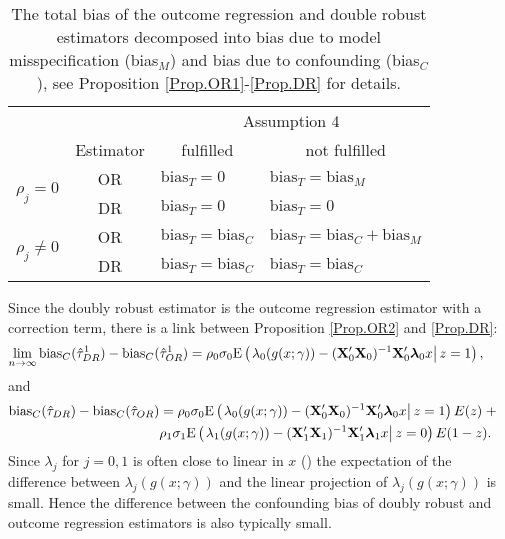 \documentclass[11pt]{article}
\newcommand{\E}{{\mbox{E}}}
\newcommand{\X}{{\bf X}}
\newcommand{\limes}{\lim \limits_{n\to\infty}}
\newcommand{\bias}{\mbox{bias}}
\begin{document}
\begin{table}[ht]
\caption{The total bias of the outcome regression and double robust estimators decomposed into bias due to model misspecification (bias$_M$) and bias due to confounding (bias$_C$), see Proposition \ref{Prop.OR1}-\ref{Prop.DR} for details.}
\begin{center}
\begin{tabular}{cc| l| l}
\hline
	&\multicolumn{1}{c}{}&\multicolumn{2}{c}{Assumption 4} \\
	&\multicolumn{1}{c}{Estimator}&\multicolumn{1}{c}{fulfilled}&\multicolumn{1}{c}{not fulfilled}\\
	\hline\hline
\multirow{2}{*}{$\rho_j=0$}&OR& $\bias_T=0$&$\bias_T=\bias_M$\\
	&DR&$\bias_T=0$& $\bias_T=0$\\
	\hline
	\multirow{2}{*}{$\rho_j\neq0$}&OR &$\bias_T=\bias_C$&$\bias_T=\bias_C +\bias_M$ \\
	&DR&$\bias_T=\bias_C$ &$\bias_T=\bias_C$ \\
\hline
\end{tabular}
\end{center}
\label{tab:bias.overview}
\end{table}
Since the doubly robust estimator is the outcome regression estimator with a correction term, there is a link between Proposition \ref{Prop.OR2} and \ref{Prop.DR}:
 \begin{align*}\limes \mbox{bias}_C(\hat \tau^1_{DR}) - \mbox{bias}_C(\hat \tau^1_{OR}) =  \rho_0 \sigma_0  \E\left(\left.\lambda_0(g(x; \gamma)) -   (\X_0' \X_0)^{-1} \X_0' {\boldsymbol \lambda_0 } x \right| z=1 \right),\qquad
 \end{align*}
 and
 \begin{align*} \mbox{bias}_C(\hat \tau_{DR}) - \mbox{bias}_C(\hat \tau_{OR}) &=   \rho_0 \sigma_0  \E\left(\left.\lambda_0(g(x; \gamma)) -   (\X_0' \X_0)^{-1} \X_0' {\boldsymbol \lambda_0 } x \right| z=1 \right)E(z)  \;+\quad \\
& \rho_1 \sigma_1  \E\left(\left.\lambda_1(g(x; \gamma)) -   (\X_1' \X_1)^{-1} \X_1' {\boldsymbol \lambda_1 } x \right| z=0 \right)E(1-z).
 \end{align*}
Since $\lambda_j$ for $j=0,1$ is often close to linear in $x$ (\citealp{P:00}) the expectation of the difference between $\lambda_j(g(x; \gamma))$ and the linear projection of $\lambda_j(g(x; \gamma))$  is small. Hence the difference between the confounding bias of doubly robust and outcome regression estimators is also typically small.
\end{document}
